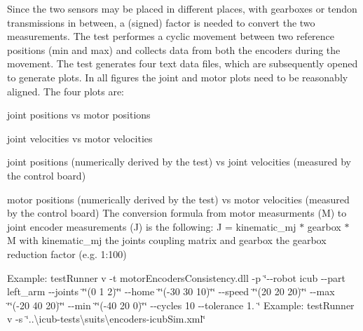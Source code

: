 Since the two sensors may be placed in different places, with gearboxes or tendon transmissions in between, a (signed) factor is needed to convert the two measurements. The test performes a cyclic movement between two reference positions (min and max) and collects data from both the encoders during the movement. The test generates four text data files, which are subsequently opened to generate plots. In all figures the joint and motor plots need to be reasonably aligned. The four plots are\+: \begin{DoxyItemize}
\item joint positions vs motor positions \item joint velocities vs motor velocities \item joint positions (numerically derived by the test) vs joint velocities (measured by the control board) \item motor positions (numerically derived by the test) vs motor velocities (measured by the control board) The conversion formula from motor measurments (M) to joint encoder measurements (J) is the following\+: J = kinematic\+\_\+mj $\ast$ gearbox $\ast$ M with kinematic\+\_\+mj the joints coupling matrix and gearbox the gearbox reduction factor (e.\+g. 1\+:100)\end{DoxyItemize}
Example\+: test\+Runner v -\/t motor\+Encoders\+Consistency.\+dll -\/p \char`\"{}-\/-\/robot icub -\/-\/part left\+\_\+arm -\/-\/joints \char`\"{}\char`\"{}(0 1 2)\char`\"{}\char`\"{} -\/-\/home \char`\"{}\char`\"{}(-\/30 30 10)\char`\"{}\char`\"{} -\/-\/speed \char`\"{}\char`\"{}(20 20 20)\char`\"{}\char`\"{} -\/-\/max \char`\"{}\char`\"{}(-\/20 40 20)\char`\"{}\char`\"{} -\/-\/min \char`\"{}\char`\"{}(-\/40 20 0)\char`\"{}\char`\"{} -\/-\/cycles 10 -\/-\/tolerance 1. \char`\"{} Example\+: test\+Runner v -\/s \char`\"{}..\textbackslash{}icub-\/tests\textbackslash{}suits\textbackslash{}encoders-\/icub\+Sim.\+xml\char`\"{}

